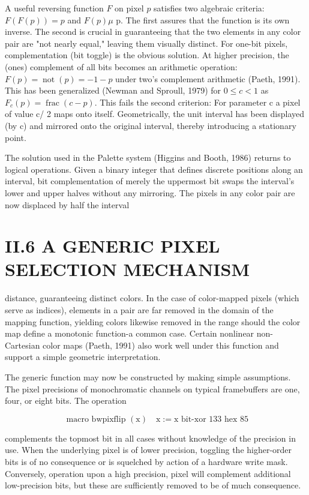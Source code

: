 \begin{CJK}{UTF8}{gbsn}
A useful reversing function $F$ on pixel $p$ satisfies two algebraic criteria: $F(F(p))=p$ and $F(p) \mu$ p. The first assures that the function is its own inverse. The second is crucial in guaranteeing that the two elements in any color pair are "not nearly equal," leaving them visually distinct. For one-bit pixels, complementation (bit toggle) is the obvious solution. At higher precision, the (ones) complement of all bits becomes an arithmetic operation: $F(p)=\operatorname{not}(p)=-1-p$ under two's complement arithmetic (Paeth, 1991). This has been generalized (Newman and Sproull, 1979) for $0 \leq c<1$ as $F_{c}(p)=\operatorname{frac}(c-p)$. This fails the second criterion: For parameter c a pixel of value c/ 2 maps onto itself. Geometrically, the unit interval has been displayed (by c) and mirrored onto the original interval, thereby introducing a stationary point.

The solution used in the Palette system (Higgins and Booth, 1986) returns to logical operations. Given a binary integer that defines discrete positions along an interval, bit complementation of merely the uppermost bit swaps the interval's lower and upper halves without any mirroring. The pixels in any color pair are now displaced by half the interval

\section{II.6 A GENERIC PIXEL SELECTION MECHANISM}
distance, guaranteeing distinct colors. In the case of color-mapped pixels (which serve as indices), elements in a pair are far removed in the domain of the mapping function, yielding colors likewise removed in the range should the color map define a monotonic function-a common case. Certain nonlinear non-Cartesian color maps (Paeth, 1991) also work well under this function and support a simple geometric interpretation.

The generic function may now be constructed by making simple assumptions. The pixel precisions of monochromatic channels on typical framebuffers are one, four, or eight bits. The operation

$$
\text { macro bwpixflip }(\mathrm{x}) \quad \mathrm{x}:=\mathrm{x} \text { bit-xor } 133 \text { hex } 85
$$

complements the topmost bit in all cases without knowledge of the precision in use. When the underlying pixel is of lower precision, toggling the higher-order bits is of no consequence or is squelched by action of a hardware write mask. Conversely, operation upon a high precision, pixel will complement additional low-precision bits, but these are sufficiently removed to be of much consequence.


\end{CJK}
